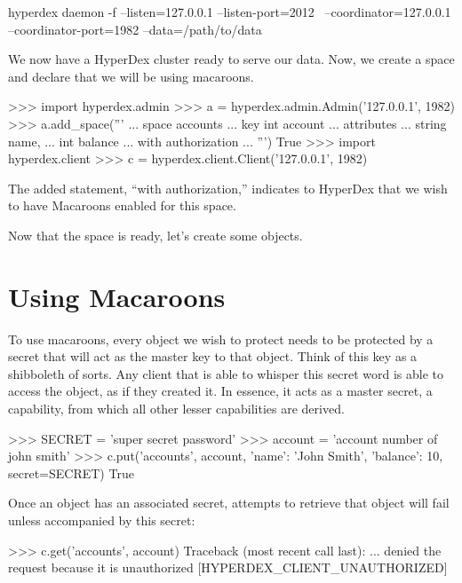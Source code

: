 \begin{consolecode}
hyperdex daemon -f --listen=127.0.0.1 --listen-port=2012 \
                   --coordinator=127.0.0.1 --coordinator-port=1982 --data=/path/to/data
\end{consolecode}

We now have a HyperDex cluster ready to serve our data.  Now, we create a space
and declare that we will be using macaroons.

\begin{pythoncode}
>>> import hyperdex.admin
>>> a = hyperdex.admin.Admin('127.0.0.1', 1982)
>>> a.add_space('''
... space accounts
... key int account
... attributes
...    string name,
...    int balance
... with authorization
... ''')
True
>>> import hyperdex.client
>>> c = hyperdex.client.Client('127.0.0.1', 1982)
\end{pythoncode}

The added statement, ``with authorization,'' indicates to HyperDex that we wish
to have Macaroons enabled for this space.

Now that the space is ready, let's create some objects.

\section{Using Macaroons}

To use macaroons, every object we wish to protect needs to be protected by a 
secret that will act as the master key to that object. Think of this key as 
a shibboleth of sorts. Any client that is able to whisper this secret word
is able to access the object, as if they created it. In essence, it acts as
a master secret, a capability, from which all other lesser capabilities are
derived.

\begin{pythoncode}
>>> SECRET = 'super secret password'
>>> account = 'account number of john smith'
>>> c.put('accounts', account, {'name': 'John Smith', 'balance': 10}, secret=SECRET)
True
\end{pythoncode}

Once an object has an associated secret, attempts to retrieve that object will fail
unless accompanied by this secret:

\begin{pythoncode}
>>> c.get('accounts', account)
Traceback (most recent call last):
... denied the request because it is unauthorized [HYPERDEX_CLIENT_UNAUTHORIZED]
\end{pythoncode}

